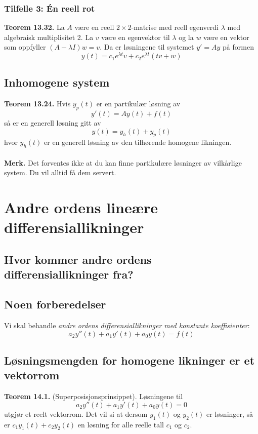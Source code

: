 \documentclass{article}
\begin{document}
\subsubsection{Tilfelle 3: Én reell rot}
\textbf{Teorem 13.32.} La $A$ være en reell $2 \times 2$-matrise med reell egenverdi $\lambda$ med algebraisk multiplisitet 2. La $v$ være en egenvektor til $\lambda$ og la $w$ være en vektor som oppfyller $(A - \lambda I)w = v$. Da er løsningene til systemet $y' = Ay$ på formen \[ y(t) = c_1e^{\lambda t}v + c_2e^{\lambda t}(tv + w) \]


\subsection{Inhomogene system}
\textbf{Teorem 13.24.} Hvis $y_p(t)$ er en partikulær løsning av
\[ y'(t) = Ay(t) + f(t) \]
så er en generell løsning gitt av
\[ y(t) = y_h(t) + y_p(t) \]
hvor $y_h(t)$ er en generell løsning av den tilhørende homogene likningen.
\\\\
\textbf{Merk.} Det forventes ikke at du kan finne partikulære løsninger av vilkårlige system. Du vil alltid få dem servert.


\clearpage
\section{Andre ordens lineære differensiallikninger}


\subsection{Hvor kommer andre ordens differensiallikninger fra?}


\subsection{Noen forberedelser}
Vi skal behandle \textit{andre ordens differensiallikninger med konstante koeffisienter}:
\[ a_2y''(t) + a_1y'(t) + a_0y(t) = f(t) \]


\subsection{Løsningsmengden for homogene likninger er et vektorrom}
\textbf{Teorem 14.1.} (Superposisjonsprinsippet). Løsningene til 
\[ a_2y''(t) + a_1y'(t) + a_0y(t) = 0 \]
utgjør et reelt vektorrom. Det vil si at dersom $y_1(t)$ og $y_2(t)$ er løsninger, så er $c_1y_1(t) + c_2y_2(t)$ en løsning for alle reelle tall $c_1$ og $c_2$.
\end{document}
